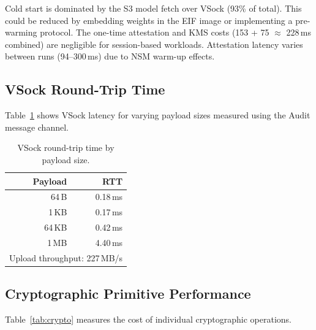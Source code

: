 \documentclass[11pt,a4paper]{article}
\newcommand{\BenchAttestationMs}{153}
\newcommand{\BenchKmsMs}{75}
\begin{document}
Cold start is dominated by the S3 model fetch over VSock (93\% of total).
This could be reduced by embedding weights in the EIF image or implementing a pre-warming protocol.
The one-time attestation and KMS costs (\BenchAttestationMs{} + \BenchKmsMs{} $\approx$ 228\,ms combined) are negligible for session-based workloads.
Attestation latency varies between runs (94--300\,ms) due to NSM warm-up effects.

\subsection{VSock Round-Trip Time}

Table~\ref{tab:vsock} shows VSock latency for varying payload sizes measured using the Audit message channel.

\begin{table}[ht]
\centering
\caption{VSock round-trip time by payload size.}
\label{tab:vsock}
\begin{tabular}{rr}
\hline
\textbf{Payload} & \textbf{RTT} \\
\hline
64\,B   & 0.18\,ms \\
1\,KB   & 0.17\,ms \\
64\,KB  & 0.42\,ms \\
1\,MB   & 4.40\,ms \\
\hline
\multicolumn{2}{l}{Upload throughput: 227\,MB/s} \\
\hline
\end{tabular}
\end{table}

\subsection{Cryptographic Primitive Performance}

Table~\ref{tab:crypto} measures the cost of individual cryptographic operations.
\end{document}
